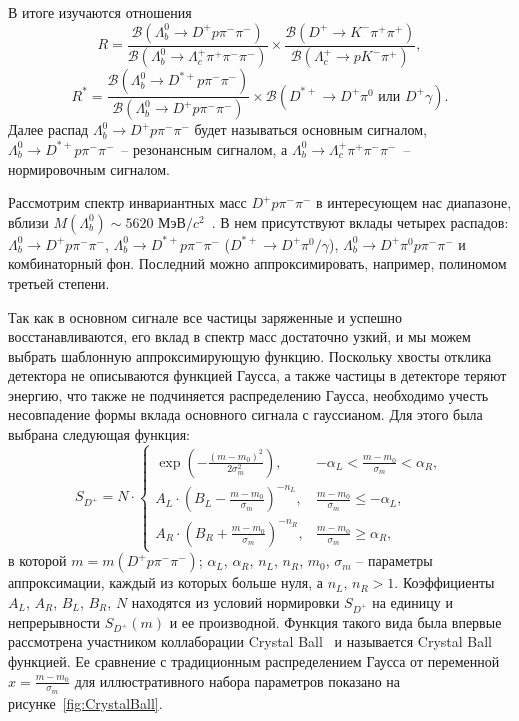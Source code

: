 \documentclass[a4paper, 12pt]{article}
\def\BR{\mathcal{B}}
\def\Lb{\varLambda_b^0}
\def\Lc{\varLambda_c^+}
\def\Dp{D^+}
\def\Dsp{D^{*+}}
\def\Km{K^-}
\def\pim{\pi^-}
\def\pip{\pi^+}
\def\piz{\pi^0}
\begin{document}
В итоге изучаются отношения 
\[ R = \frac{\BR(\Lb\to\Dp p \pim\pim)}{\BR(\Lb\to\Lc\pip\pim\pim)} 
  \times \frac{\BR(\Dp\to\Km\pip\pip)}{\BR(\Lc\to p\Km\pip)} , \]
\[ R^* = \frac{\BR(\Lb\to\Dsp p\pim\pim)}{\BR(\Lb\to\Dp p\pim\pim)} 
  \times {\BR(\Dsp\to\Dp\piz \text{ или } \Dp\gamma)}  . \]
Далее распад $\Lb\to\Dp p\pim\pim$ будет называться основным сигналом, $\Lb\to\Dsp p\pim\pim$~-- резонансным сигналом, а $\Lb\to\Lc\pip\pim\pim$~-- нормировочным сигналом. 

Рассмотрим спектр инвариантных масс $\Dp p\pim\pim$ в интересующем нас диапазоне, вблизи $M(\Lb) \sim 5620$ МэВ$/c^2$~\cite{PDG}.
В нем присутствуют вклады четырех распадов: $\Lb\to\Dp p\pim\pim$, $\Lb\to\Dsp p\pim\pim$ ($\Dsp\to\Dp\piz/\gamma$), $\Lb\to\Dp\piz p\pim\pim$ и комбинаторный фон. Последний можно аппроксимировать, например, полиномом третьей степени. 

Так как в основном сигнале все частицы заряженные и успешно восстанавливаются, его вклад в спектр масс достаточно узкий, и мы можем выбрать шаблонную аппроксимирующую функцию.
Поскольку хвосты отклика детектора не описываются функцией Гаусса, а также частицы в детекторе теряют энергию, что также не подчиняется распределению Гаусса, необходимо учесть несовпадение формы вклада основного сигнала с гауссианом. 
Для этого была выбрана следующая функция: 
\begin{equation}
S_{\Dp} = N\cdot
\begin{cases}
\exp\left(-\frac{(m-m_0)^2}{2\sigma_m^2}\right), & -\alpha_L < \frac{m-m_0}{\sigma_m} < \alpha_R, \\
A_L\cdot\left(B_L - \frac{m-m_0}{\sigma_m}\right)^{-n_L}, & \frac{m-m_0}{\sigma_m} \leq -\alpha_L, \\
A_R\cdot\left(B_R + \frac{m-m_0}{\sigma_m}\right)^{-n_R}, & \frac{m-m_0}{\sigma_m} \geq \alpha_R, 
\end{cases}
\label{eq:S1}
\end{equation}
в которой $m = m(\Dp p\pim\pim)$; $\alpha_L$, $\alpha_R$, $n_L$, $n_R$, $m_0$, $\sigma_m$ -- параметры аппроксимации, каждый из которых больше нуля, а $n_L,\,n_R>1$. 
Коэффициенты $A_L$, $A_R$, $B_L$, $B_R$, $N$ находятся из условий нормировки $S_{\Dp}$ на единицу и непрерывности $S_{\Dp}(m)$ и ее производной. 
Функция такого вида была впервые рассмотрена участником коллаборации Crystal Ball~\cite{CrystalBallFunction} и называется Crystal Ball функцией. 
Ее сравнение с традиционным распределением Гаусса от переменной $x=\frac{m-m_0}{\sigma_m}$ для иллюстративного набора параметров показано на рисунке~\ref{fig:CrystalBall}.
\end{document}
